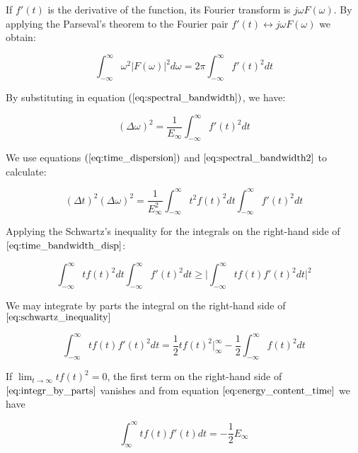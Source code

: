 If $f'(t)$ is the derivative of the function, its Fourier transform is $j\omega F(\omega)$. By applying the Parseval's theorem to the Fourier pair $f'(t)\longleftrightarrow j\omega F(\omega)$ we obtain:

\begin{equation}\label{eq:applyed_parseval_theorem}
    \int_{-\infty}^{\infty} \omega^2 |F(\omega)|^2 d\omega = 2 \pi \int_{-\infty}^{\infty} f'(t)^2 dt
\end{equation}

By substituting in equation $(\eqref{eq:spectral_bandwidth})$, we have:

\begin{equation}\label{eq:spectral_bandwidth2}
    (\Delta \omega)^2 = \frac{1}{E_{\infty}} \int_{-\infty}^{\infty} f'(t)^2 dt
\end{equation}

We use equations $(\eqref{eq:time_dispersion})$ and $\eqref{eq:spectral_bandwidth2}$ to calculate:

\begin{equation}\label{eq:time_bandwidth_disp}
    (\Delta t)^2(\Delta \omega)^2 = \frac{1}{E_{\infty}^{2}} \int_{-\infty}^{\infty} t^2f(t)^2 dt \int_{-\infty}^{\infty}f'(t)^2 dt
\end{equation}

Applying the Schwartz's inequality for the integrals on the right-hand side of $\eqref{eq:time_bandwidth_disp}$:

\begin{equation}\label{eq:schwartz_inequality}
    \int_{-\infty}^{\infty}tf(t)^2 dt \int_{-\infty}^{\infty}f'(t)^2 dt  \geq \biggr\rvert \int_{-\infty}^{\infty}tf(t)f'(t)^2 dt \biggr\rvert^{2}
\end{equation}


We may integrate by parts the integral on the right-hand side of $\eqref{eq:schwartz_inequality}$

\begin{equation}\label{eq:integr_by_parts}
    \int_{-\infty}^{\infty}tf(t)f'(t)^2 dt =  \frac{1}{2}tf(t)^2 \biggr\rvert_{\infty}^{\infty} - \frac{1}{2} \int_{-\infty}^{\infty}f(t)^2 dt
\end{equation}

If $\lim_{t\rightarrow \infty} tf(t)^2=0$, the first term on the right-hand side of $\eqref{eq:integr_by_parts}$ vanishes and from equation $\eqref{eq:energy_content_time}$ we have

\begin{equation}\label{eq:energy_content_developped}
    \int_{\infty}^{\infty} tf(t)f'(t) dt = -\frac{1}{2} E_{\infty}
\end{equation}

